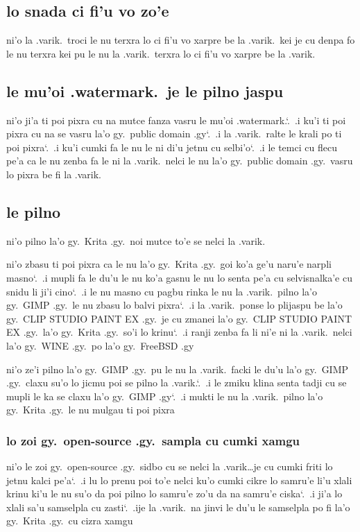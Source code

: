 \documentclass{report}
\newcommand\sds{\spacefactor\sfcode`.\ \space}
\begin{document}
\subsection{lo snada ci fi'u vo zo'e}
ni'o la .varik.\ troci le nu terxra lo ci fi'u vo xarpre be la .varik.\ kei je cu denpa fo le nu terxra kei pu le nu la .varik.\ terxra lo ci fi'u vo xarpre be la .varik.
\subsection{le mu'oi .watermark.\ je le pilno jaspu}
ni'o ji'a ti poi pixra cu na mutce fanza vasru le mu'oi .watermark.\sds  .i ku'i ti poi pixra cu na se vasru la'o gy.\ public domain .gy\sds  .i la .varik.\ ralte le krali po ti poi pixra\sds  .i ku'i cumki fa le nu le ni di'u jetnu cu selbi'o\sds  .i le temci cu flecu pe'a ca le nu zenba fa le ni la .varik.\ nelci le nu la'o gy.\ public domain .gy.\ vasru lo pixra be fi la .varik.

\subsection{le pilno}
ni'o pilno la'o gy.\ Krita .gy.\ noi mutce to'e se nelci la .varik.

ni'o zbasu ti poi pixra ca le nu la'o gy.\ Krita .gy.\ goi ko'a ge'u naru'e narpli masno\sds  .i mupli fa le du'u le nu ko'a gasnu le nu lo senta pe'a cu selvisnalka'e cu snidu li ji'i cino\sds  .i le nu masno cu pagbu rinka le nu la .varik.\ pilno la'o gy.\ GIMP .gy.\ le nu zbasu lo balvi pixra\sds  .i la .varik.\ ponse lo plijaspu be la'o gy.\ CLIP STUDIO PAINT EX .gy.\ je cu zmanei la'o gy.\ CLIP STUDIO PAINT EX .gy.\ la'o gy.\ Krita .gy.\ so'i lo krinu\sds  .i ranji zenba fa li ni'e ni la .varik.\ nelci la'o gy.\ WINE .gy.\ po la'o gy.\ FreeBSD .gy

ni'o ze'i pilno la'o gy.\ GIMP .gy.\ pu le nu la .varik.\ facki le du'u la'o gy.\ GIMP .gy.\ claxu su'o lo jicmu poi se pilno la .varik.\sds  .i le zmiku klina senta tadji cu se mupli le ka se claxu la'o gy.\ GIMP .gy\sds  .i mukti le nu la .varik.\ pilno la'o gy.\ Krita .gy.\ le nu mulgau ti poi pixra

\subsubsection{lo zoi gy.\ open-source .gy.\ sampla cu cumki xamgu}
ni'o le zoi gy.\ open-source .gy.\ sidbo cu se nelci la .varik\ldots je cu cumki friti lo jetnu kalci pe'a\sds  .i lu lo prenu poi to'e nelci ku'o cumki cikre lo samru'e li'u xlali krinu ki'u le nu su'o da poi pilno lo samru'e zo'u da na samru'e ciska\sds  .i ji'a lo xlali sa'u samselpla cu zasti\sds  .ije la .varik.\ na jinvi le du'u le samselpla po fi la'o gy.\ Krita .gy.\ cu cizra xamgu
\end{document}
